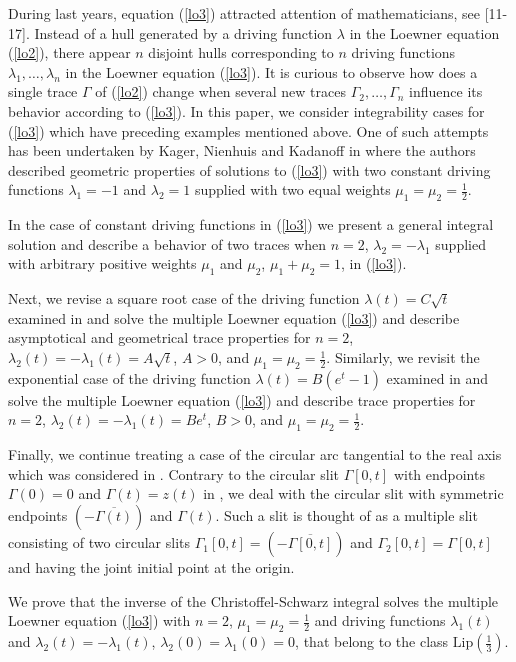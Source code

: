 \documentclass[
11pt,%
tightenlines,%
twoside,%
onecolumn,%
nofloats,%
nobibnotes,%
nofootinbib,%
superscriptaddress,%
noshowpacs,%
centertags]%
{revtex4}
\begin{document}
During last years, equation (\ref{lo3}) attracted attention of mathematicians, see [11-17]. Instead of a hull generated by a driving function $\lambda$ in the Loewner equation (\ref{lo2}), there appear $n$ disjoint hulls corresponding to $n$ driving functions $\lambda_1,\dots,\lambda_n$ in the Loewner equation (\ref{lo3}). It is curious to observe how does a single trace $\Gamma$ of (\ref{lo2}) change when several new traces $\Gamma_2,\dots,\Gamma_n$ influence its behavior according to (\ref{lo3}). In this paper, we consider integrability cases for (\ref{lo3}) which have preceding examples mentioned above. One of such attempts has been undertaken by Kager, Nienhuis and Kadanoff in \cite{KagNieKad} where the authors described geometric properties of solutions to (\ref{lo3}) with two constant driving functions $\lambda_1=-1$ and $\lambda_2=1$ supplied with two equal weights $\mu_1=\mu_2=\frac{1}{2}$.

In the case of constant driving functions in (\ref{lo3}) we present a general integral solution and describe a behavior of two traces when $n=2$, $\lambda_2=-\lambda_1$ supplied with arbitrary positive weights $\mu_1$ and $\mu_2$, $\mu_1+\mu_2=1$, in (\ref{lo3}).

Next, we revise a square root case of the driving function $\lambda(t)=C\sqrt t$ examined in \cite{KagNieKad} and solve the multiple Loewner equation (\ref{lo3}) and describe asymptotical and geometrical trace properties for $n=2$, $\lambda_2(t)=-\lambda_1(t)=A\sqrt t$, $A>0$, and $\mu_1=\mu_2=\frac{1}{2}$. Similarly, we revisit the exponential case of the driving function $\lambda(t)=B(e^t-1)$ examined in \cite{ProZak} and solve the multiple Loewner equation (\ref{lo3}) and describe trace properties for $n=2$, $\lambda_2(t)=-\lambda_1(t)=Be^t$, $B>0$, and $\mu_1=\mu_2=\frac{1}{2}$.

Finally, we continue treating a case of the circular arc tangential to the real axis which was considered in \cite{ProVas}. Contrary to the circular slit $\Gamma[0,t]$ with endpoints $\Gamma(0)=0$ and $\Gamma(t)=z(t)$ in \cite{ProVas}, we deal with the circular slit with symmetric endpoints $(-\overline{\Gamma(t)})$ and $\Gamma(t)$. Such a slit is thought of as a multiple slit consisting of two circular slits $\Gamma_1[0,t]=(-\overline{\Gamma[0,t]})$ and $\Gamma_2[0,t]=\Gamma[0,t]$ and having the joint initial point at the origin.

We prove that the inverse of the Christoffel-Schwarz integral solves the multiple Loewner equation (\ref{lo3}) with $n=2$, $\mu_1=\mu_2=\frac{1}{2}$ and driving functions $\lambda_1(t)$ and $\lambda_2(t)=-\lambda_1(t)$, $\lambda_2(0)=\lambda_1(0)=0$, that belong to the class $\text{Lip}(\frac{1}{3})$.
\end{document}

